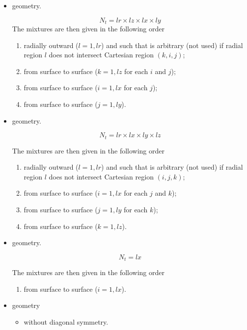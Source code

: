 \begin{itemize}
\item {} geometry.

$$N_{t}=\textit{lr}\times\textit{lz}\times \textit{lx}\times \textit{ly}$$
The mixtures are then given in the following order
\begin{enumerate}
\item radially outward ($l=1,\textit{lr}$) and such that   is arbitrary (not used) if radial region $l$ does not intersect Cartesian region $(k,i,j)$;
\item from surface  to surface  ($k=1,\textit{lz}$ for each $i$ and $j$);
\item from surface  to surface  ($i=1,\textit{lx}$ for each $j$);
\item from surface  to surface  ($j=1,\textit{ly}$).
\end{enumerate}

\item {} geometry.

$$N_{t}= \textit{lr}\times\textit{lx}\times \textit{ly}\times \textit{lz}$$

The mixtures are then given in the following order
\begin{enumerate}
\item radially outward ($l=1,\textit{lr}$) and such that  is arbitrary (not used) if radial region $l$ does not intersect Cartesian region $(i,j,k)$;
\item from surface  to surface  ($i=1,\textit{lx}$ for each $j$ and $k$);
\item from surface  to surface  ($j=1,\textit{ly}$ for each $k$);
\item from surface  to surface  ($k=1,\textit{lz}$).
\end{enumerate}

\item {} geometry.

$$N_{t}=\textit{lx}$$

The mixtures are then given in the following order
\begin{enumerate}
\item from surface  to surface  ($i=1,\textit{lx}$).
\end{enumerate}

\item {} geometry 
\begin{itemize}
\item without diagonal symmetry. 


\end{itemize}
\end{itemize}
